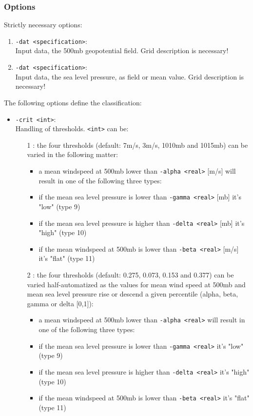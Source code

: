 \documentclass[12pt, oneside, a4paper, headsepline, plainheadsepline]{scrbook}
\begin{document}
\subsubsection*{Options}
Strictly necessary options:
\begin{enumerate}
 \item \verb+-dat <specification>+:\\ Input data, the 500mb geopotential field. Grid description is necessary!
 \item \verb+-dat <specification>+:\\ Input data, the sea level pressure, as field or mean value. Grid description is necessary!
\end{enumerate}
The following options define the classification:
\begin{itemize}
 \item \verb+-crit <int>+:\\ Handling of thresholds. \verb+<int>+ can be:
 \begin{itemize}
 \item[1]: the four thresholds (default: 7m/s, 3m/s, 1010mb and 1015mb) can be varied in the following matter:
 \begin{itemize}
  \item a mean windspeed at 500mb lower than \texttt{-alpha <real>} [m/s] will result in one of the following three types:
  \item if the mean sea level pressure is lower than \texttt{-gamma <real>} [mb] it's "low" (type 9)
  \item if the mean sea level pressure is higher than \texttt{-delta <real>} [mb] it's "high" (type 10)
  \item if the mean windspeed at 500mb is lower than \texttt{-beta <real>} [m/s] it's "flat" (type 11)
 \end{itemize}
 \item[2]: the four thresholds (default: 0.275, 0.073, 0.153 and 0.377) can be varied half-automatized as the values for mean wind speed at 500mb and mean sea level pressure rise or descend a given percentile (alpha, beta, gamma or delta [0,1]):
\begin{itemize}
\item a mean windspeed at 500mb lower than \texttt{-alpha <real>} will result in one of the following three types:
\item if the mean sea level pressure is lower than \texttt{-gamma <real>} it's "low" (type 9)
\item if the mean sea level pressure is higher than \texttt{-delta <real>} it's "high" (type 10)
\item if the mean windspeed at 500mb is lower than \texttt{-beta <real>} it's "flat" (type 11)
\end{itemize}
 \end{itemize}
\end{itemize}
\end{document}

